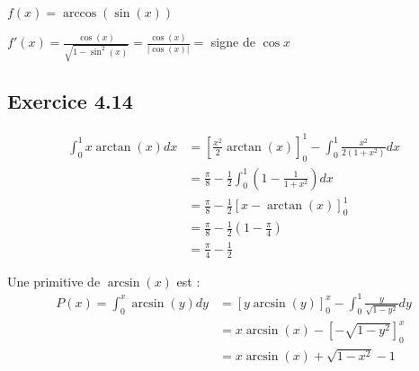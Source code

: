 \documentclass[a4paper,10pt]{report}
\begin{document}
$f(x) = \arccos(\sin(x)) $

$f'(x) = \frac{\cos(x)}{\sqrt{1-\sin^2(x)}} = \frac{\cos(x)}{|\cos(x)|} =$ signe de $\cos x$

\subsection*{Exercice 4.14}

\begin{equation*}
	\begin{split}
		\int_0^1 x \arctan(x) dx &= \left[ \frac{x^2}{2} \arctan(x) \right] _0^1 - \int_0^1 \frac{x^2}{2(1+x^2)} dx \\
		                         &= \frac{\pi}{8} - \frac{1}{2} \int_0^1 \left( 1 - \frac{1}{1+x^2}\right) dx \\
		                         &= \frac{\pi}{8} - \frac{1}{2}\left[ x -\arctan(x) \right]_0^1 \\
		                         &= \frac{\pi}{8} - \frac{1}{2} \left(1 - \frac{\pi}{4}  \right)  \\
		                         &= \frac{\pi}{4} - \frac{1}{2}
	\end{split}
\end{equation*}

Une primitive de $\arcsin(x)$ est :
\begin{equation*}
	\begin{split}
		P(x) = \int_0^x \arcsin(y) dy &= \left[ y \arcsin(y) \right]_0^x - \int_0^1 \frac{y}{\sqrt{1-y^2}} dy \\
		&= x \arcsin(x) - [-\sqrt{1-y^2}]_0^x \\
		&= x \arcsin(x) + \sqrt{1-x^2} -1
	\end{split}
\end{equation*}
\end{document}
